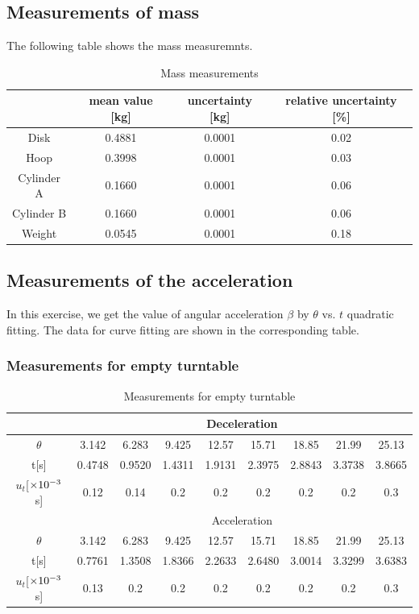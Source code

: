 \subsection{Measurements of mass}
    The following table shows the mass measuremnts.
    \begin{table}[H] \small
        \centering
        \begin{tabular}{|c|c|c|c|}
            \hline
            & mean value [kg] & uncertainty [kg] & relative uncertainty [\%]\\\hline
            Disk & 0.4881 & 0.0001 & 0.02\\\hline
            Hoop & 0.3998 & 0.0001 & 0.03\\\hline
            Cylinder A & 0.1660 & 0.0001 & 0.06\\\hline
            Cylinder B & 0.1660 & 0.0001 & 0.06\\\hline
            Weight & 0.0545 & 0.0001 & 0.18\\\hline
        \end{tabular}
        \caption{Mass measurements}\label{data_mass}
    \end{table}

\subsection{Measurements of the acceleration}
    In this exercise, we get the value of angular acceleration $\beta$ by $\theta$ vs. $t$ quadratic fitting. The data for curve fitting are shown in the corresponding table.
\subsubsection{Measurements for empty turntable}
    \begin{table}[H] \small
        \centering
        \begin{tabular}{|c|c|c|c|c|c|c|c|c|}
            \hline
            & \multicolumn{8}{c|}{Deceleration} \\\hline
            $\theta$ & 3.142 & 6.283 & 9.425 & 12.57 & 15.71 & 18.85 & 21.99 & 25.13\\\hline
            t[s] & 0.4748 & 0.9520 & 1.4311 & 1.9131 & 2.3975 & 2.8843 & 3.3738 & 3.8665\\\hline
            $u_t$[$\times10^{-3}$s] & 0.12 & 0.14 & 0.2 & 0.2 & 0.2 & 0.2 & 0.2 & 0.3\\\hline
            & \multicolumn{8}{c|}{Acceleration} \\\hline
            $\theta$ & 3.142 & 6.283 & 9.425 & 12.57 & 15.71 & 18.85 & 21.99 & 25.13\\\hline
            t[s] & 0.7761 & 1.3508 & 1.8366 & 2.2633 & 2.6480 & 3.0014 & 3.3299 & 3.6383\\\hline
            $u_t$[$\times10^{-3}$s] & 0.13 & 0.2 & 0.2 & 0.2 & 0.2 & 0.2 & 0.2 & 0.3\\\hline
        \end{tabular}
        \caption{Measurements for empty turntable}\label{data_1}
    \end{table}

